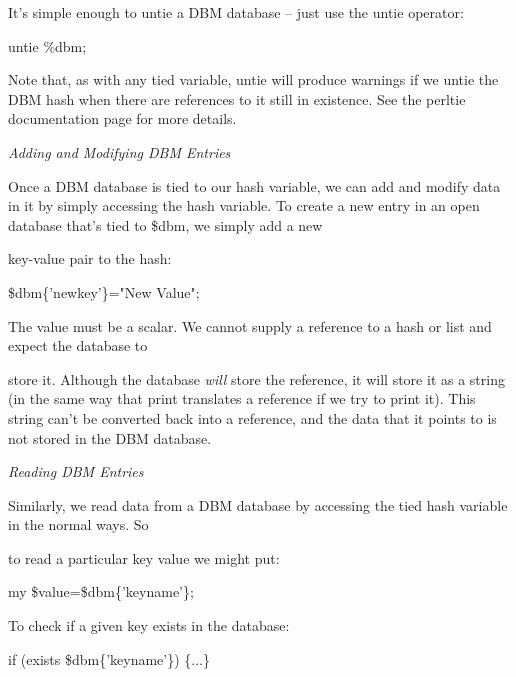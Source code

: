 \documentclass[a4paper,11pt]{book}
\begin{document}
\noindent 

\noindent It's simple enough to untie a DBM database -- just use the untie operator:

\noindent 

\noindent untie \%dbm;

\noindent 

\noindent Note that, as with any tied variable, untie will produce warnings if we untie the DBM hash when there are references to it still in existence. See the perltie documentation page for more details.

\noindent 

\noindent \textit{Adding and Modifying DBM Entries}

\noindent Once a DBM database is tied to our hash variable, we can add and modify data in it by simply accessing the hash variable. To create a new entry in an open database that's tied to \$dbm, we simply add a new

\noindent key-value pair to the hash:

\noindent 

\noindent \$dbm\{'newkey'\}="New Value";

\noindent 

\noindent 

\noindent The value must be a scalar. We cannot supply a reference to a hash or list and expect the database to

\noindent store it. Although the database \textit{will }store the reference, it will store it as a string (in the same way that print translates a reference if we try to print it). This string can't be converted back into a reference, and the data that it points to is not stored in the DBM database.

\noindent 

\noindent \textit{Reading DBM Entries}

\noindent Similarly, we read data from a DBM database by accessing the tied hash variable in the normal ways. So

\noindent to read a particular key value we might put:

\noindent 

\noindent my \$value=\$dbm\{'keyname'\};

\noindent 

\noindent To check if a given key exists in the database:

\noindent 

\noindent if (exists \$dbm\{'keyname'\}) \{...\}
\end{document}
